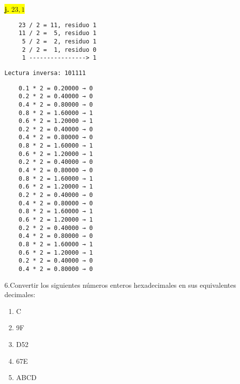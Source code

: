 \documentclass[a4paper,12pt]{article}
\begin{document}
\begin{center}
	\colorbox{yellow}{{\textbf{j.} $23,1$}} \\ \vspace{0.3cm}
\end{center}	
\vspace{-1em}
\begin{minipage}[t]{0.40\textwidth}
	\hspace{2,5cm}
	
	\begin{Verbatim}
	23 / 2 = 11, residuo 1
	11 / 2 =  5, residuo 1
	 5 / 2 =  2, residuo 1
	 2 / 2 =  1, residuo 0
	 1 ----------------> 1
	\end{Verbatim}
	\hspace{1,5cm}\texttt{Lectura inversa: 101111}
\end{minipage}
\hfill
\begin{minipage}[t]{0.40\textwidth}
	\hspace{2cm}
	
	\begin{Verbatim}
	0.1 * 2 = 0.20000 → 0 
	0.2 * 2 = 0.40000 → 0 
	0.4 * 2 = 0.80000 → 0 
	0.8 * 2 = 1.60000 → 1 
	0.6 * 2 = 1.20000 → 1 
	0.2 * 2 = 0.40000 → 0 
	0.4 * 2 = 0.80000 → 0 
	0.8 * 2 = 1.60000 → 1 
	0.6 * 2 = 1.20000 → 1 
	0.2 * 2 = 0.40000 → 0 
	0.4 * 2 = 0.80000 → 0 
	0.8 * 2 = 1.60000 → 1 
	0.6 * 2 = 1.20000 → 1 
	0.2 * 2 = 0.40000 → 0 
	0.4 * 2 = 0.80000 → 0 
	0.8 * 2 = 1.60000 → 1 
	0.6 * 2 = 1.20000 → 1 
	0.2 * 2 = 0.40000 → 0 
	0.4 * 2 = 0.80000 → 0 
	0.8 * 2 = 1.60000 → 1 
	0.6 * 2 = 1.20000 → 1 
	0.2 * 2 = 0.40000 → 0 
	0.4 * 2 = 0.80000 → 0 
	\end{Verbatim}
\end{minipage}
\begin{center}
	\hspace{2cm}
\end{center}
	\newpage
	6.Convertir los siguientes números enteros hexadecimales en sus equivalentes
	decimales:
	\begin{enumerate}
		\item C 
		\item 9F 
		\item D52 
		\item 67E 
		\item ABCD
	\end{enumerate}
	
\end{document}
